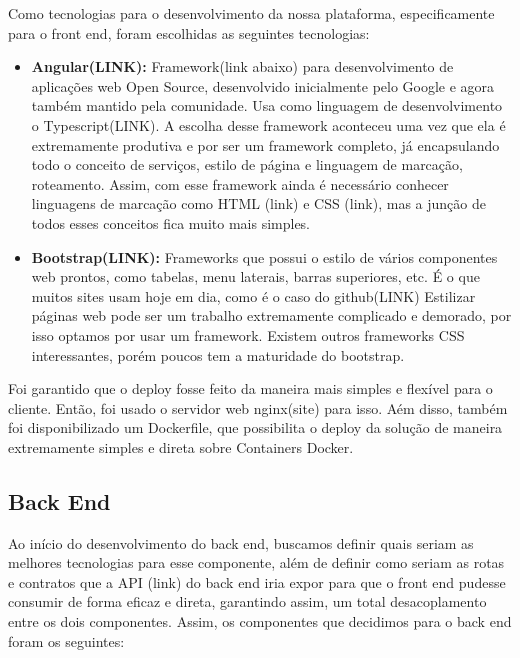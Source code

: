 \documentclass[11pt,twoside]{article}
\begin{document}
Como tecnologias para o desenvolvimento da nossa plataforma, especificamente para o front end, foram escolhidas as seguintes tecnologias:

\begin{itemize}
  \item \textbf{Angular(LINK):} Framework(link abaixo) para desenvolvimento de aplicações web Open Source, desenvolvido inicialmente pelo Google e agora também mantido pela comunidade. Usa como linguagem de desenvolvimento o
  Typescript(LINK). A escolha desse framework aconteceu uma vez que ela é extremamente produtiva e por ser um framework completo, já encapsulando todo o conceito de serviços, estilo de página e 
  linguagem de marcação, roteamento. Assim, com esse framework ainda é necessário conhecer linguagens de marcação como HTML (link) e CSS (link), mas a junção de todos esses conceitos fica muito mais simples.
  \item \textbf{Bootstrap(LINK):} Frameworks que possui o estilo de vários componentes web prontos, como tabelas, menu laterais, barras superiores, etc. É o que muitos sites usam hoje em dia, como é o caso do github(LINK)
  Estilizar páginas web pode ser um trabalho extremamente complicado e demorado, por isso optamos por usar um framework. Existem outros frameworks CSS interessantes, porém poucos tem a maturidade do bootstrap.
\end{itemize}

Foi garantido que o deploy fosse feito da maneira mais simples e flexível para o cliente. Então, foi usado o servidor web nginx(site) para isso. Aém disso, também foi disponibilizado um Dockerfile, que possibilita
o deploy da solução de maneira extremamente simples e direta sobre Containers Docker.

\subsection{Back End}

Ao início do desenvolvimento do back end, buscamos definir quais seriam as melhores tecnologias para esse componente, além de definir como seriam as rotas e contratos que a API (link) do back end iria expor
para que o front end pudesse consumir de forma eficaz e direta, garantindo assim, um total desacoplamento entre os dois componentes. Assim, os componentes que decidimos para o back end foram os seguintes:
\end{document}
